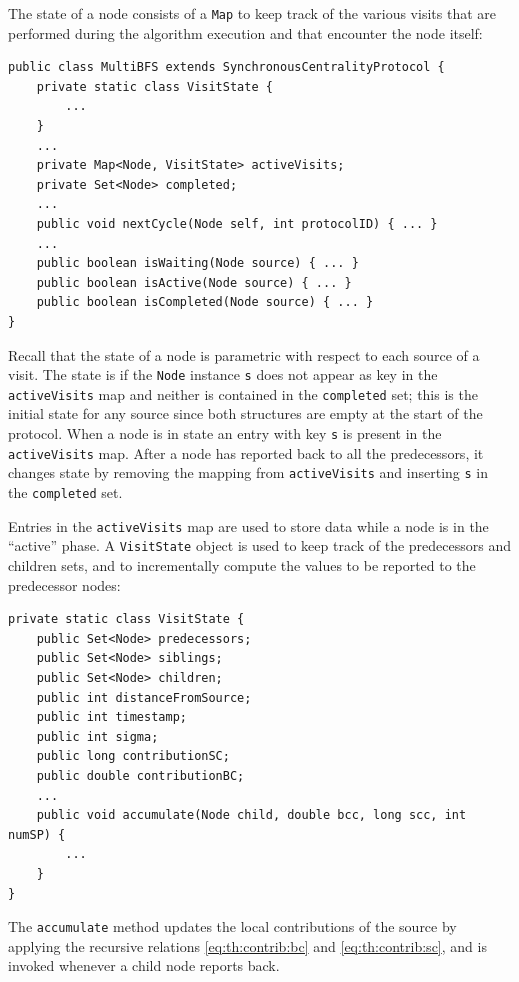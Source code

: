 The state of a \multibfs{} node consists of a \texttt{Map} to keep track of the various visits that are performed during the algorithm execution and that encounter the node itself:

\begin{verbatim}
public class MultiBFS extends SynchronousCentralityProtocol {
    private static class VisitState {
        ...
    }
    ...
    private Map<Node, VisitState> activeVisits;
    private Set<Node> completed;
    ...
    public void nextCycle(Node self, int protocolID) { ... }
    ...
    public boolean isWaiting(Node source) { ... }
    public boolean isActive(Node source) { ... }
    public boolean isCompleted(Node source) { ... }
}
\end{verbatim}
Recall that the state of a node is parametric with respect to each source of a visit. The state is  if the \texttt{Node} instance \texttt{s} does not appear as key in the \texttt{activeVisits} map and neither is contained in the \texttt{completed} set; this is the initial state for any source since both structures are empty at the start of the protocol. When a node is in state  an entry with key \texttt{s} is present in the \texttt{activeVisits} map. After a node has reported back to all the predecessors, it changes state  by removing the mapping from \texttt{activeVisits} and inserting \texttt{s} in the \texttt{completed} set.

Entries in the \texttt{activeVisits} map are used to store data while a node is in the ``active'' phase. A \texttt{VisitState} object is used to keep track of the predecessors and children sets, and to incrementally compute the values to be reported to the predecessor nodes:
\begin{verbatim}
private static class VisitState {
    public Set<Node> predecessors;
    public Set<Node> siblings;
    public Set<Node> children;
    public int distanceFromSource;
    public int timestamp;
    public int sigma;
    public long contributionSC;
    public double contributionBC;
    ...	
    public void accumulate(Node child, double bcc, long scc, int numSP) {
        ...
    }
}
\end{verbatim}
The \texttt{accumulate} method updates the local contributions of the source by applying the recursive relations \eqref{eq:th:contrib:bc} and \eqref{eq:th:contrib:sc}, and is invoked whenever a child node reports back.

